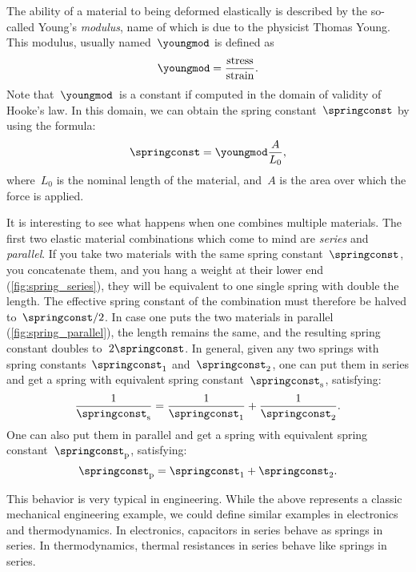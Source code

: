     The ability of a material to being deformed elastically is described by the so-called Young's \emph{modulus}, name of which is due to the physicist Thomas Young.
    This modulus, usually named~$\youngmod$ is defined as
    \begin{equation*}
        \youngmod=\frac{\text{stress}}{\text{strain}}.
    \end{equation*}
    Note that~$\youngmod$~is a constant if computed in the domain of validity of Hooke's law.
    In this domain, we can obtain the spring constant~$\springconst$ by using the formula:
    \begin{equation*}
        \springconst=\youngmod \frac{A}{L_0},
    \end{equation*}
    where~$L_0$ is the nominal length of the material, and~$A$ is the area over which the force is applied.

    It is interesting to see what happens when one combines multiple materials.
    The first two elastic material combinations which come to mind are \emph{series} and \emph{parallel}.
    If you take two materials with the same spring constant~$\springconst$, you concatenate them, and you hang a weight at their lower end (\cref{fig:spring_series}), they will be equivalent to one single spring with double the length.
    The effective spring constant of the combination must therefore be halved to~$\springconst/2$.
    In case one puts the two materials in parallel (\cref{fig:spring_parallel}), the length remains the same, and the resulting spring constant doubles to~$2\springconst$.
    In general, given any two springs with spring constants~$\springconst_1$ and~$\springconst_2$, one can put them in series and get a spring with equivalent spring constant~$\springconst_{\mathrm{s}}$, satisfying:
    \begin{equation*}
        \frac{1}{\springconst_\mathrm{s}}=\frac{1}{\springconst_1}+\frac{1}{\springconst_2}.
    \end{equation*}
    One can also put them in parallel and get a spring with equivalent spring constant~$\springconst_\mathrm{p}$, satisfying:
\begin{equation*}
    \springconst_\mathrm{p}=\springconst_1+\springconst_2.
\end{equation*}

\begin{remark}
    This behavior is very typical in engineering.
    While the above represents a classic mechanical engineering example, we could define similar examples in electronics and thermodynamics.
    In electronics, capacitors in series behave as springs in series.
    In thermodynamics, thermal resistances in series behave like springs in series.
\end{remark}

